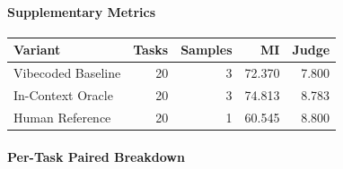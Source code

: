 \paragraph{Supplementary Metrics}

\begin{table}[t]
\centering
\label{tab:specoracle-comparison}
\begin{tabular}{lrrrr}
\hline
Variant & Tasks & Samples & MI & Judge \\
\hline
Vibecoded Baseline & 20 & 3 & 72.370 & 7.800 \\
In-Context Oracle & 20 & 3 & 74.813 & 8.783 \\
Human Reference & 20 & 1 & 60.545 & 8.800 \\
\hline
\end{tabular}
\end{table}

\paragraph{Per-Task Paired Breakdown}

